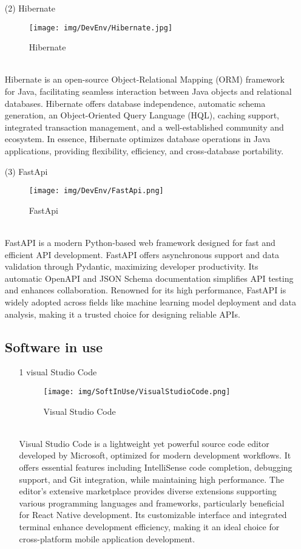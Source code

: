 \documentclass[conference]{IEEEtran}
\begin{document}
\begin{enumerate}
\begin{itemize}
\begin{itemize}
\item [(2)] Hibernate\cite{Hibernate}
\begin{figure}[h]
\centering
\texttt{[image: img/DevEnv/Hibernate.jpg]}
\caption{Hibernate} 
\end{figure}\\
Hibernate is an open-source Object-Relational Mapping (ORM) framework for Java, facilitating seamless interaction between Java objects and relational databases. Hibernate offers database independence, automatic schema generation, an Object-Oriented Query Language (HQL), caching support, integrated transaction management, and a well-established community and ecosystem. In essence, Hibernate optimizes database operations in Java applications, providing flexibility, efficiency, and cross-database portability.\\

\item [(3)] FastApi\cite{FastAPI}\\
\begin{figure}[h]
\centering
\texttt{[image: img/DevEnv/FastApi.png]}
\caption{FastApi} 
\end{figure} \\ 
FastAPI is a modern Python-based web framework designed for fast and efficient API development. FastAPI offers asynchronous support and data validation through Pydantic, maximizing developer productivity. Its automatic OpenAPI and JSON Schema documentation simplifies API testing and enhances collaboration. Renowned for its high performance, FastAPI is widely adopted across fields like machine learning model deployment and data analysis, making it a trusted choice for designing reliable APIs.\\

\clearpage


\subsection{Software in use}
\begin{enumerate}
\item[1] visual Studio Code
\begin{figure}[h]
\centering
\texttt{[image: img/SoftInUse/VisualStudioCode.png]}
\caption{Visual Studio Code} 
\end{figure}\\
Visual Studio Code is a lightweight yet powerful source code editor developed by Microsoft, optimized for modern development workflows. It offers essential features including IntelliSense code completion, debugging support, and Git integration, while maintaining high performance. The editor's extensive marketplace provides diverse extensions supporting various programming languages and frameworks, particularly beneficial for React Native development. Its customizable interface and integrated terminal enhance development efficiency, making it an ideal choice for cross-platform mobile application development.
\\


\end{enumerate}
\end{itemize}
\end{itemize}
\end{enumerate}
\end{document}
